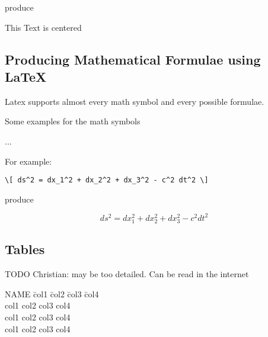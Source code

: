 produce 

\begin{center}
This Text is centered
\end{center}


\subsection{Producing Mathematical Formulae using \LaTeX}

Latex supports almost every math symbol and every possible formulae.

Some examples for the math symbols

... 


For example:

\begin{verbatim}
\[ ds^2 = dx_1^2 + dx_2^2 + dx_3^2 - c^2 dt^2 \]
\end{verbatim}

produce 

\[ ds^2 = dx_1^2 + dx_2^2 + dx_3^2 - c^2 dt^2 \]





\subsection{Tables}

TODO Christian: may be too detailed. Can be read in the internet

\begin{tabbing}
\textsc{NAME} \=col1 \=col2 \=col3 \=col4 \\
\>col1 \>col2 \>col3 \>col4 \\
\>col1 \>col2 \>col3 \>col4 \\
\>col1 \>col2 \>col3 \>col4 \\
\end{tabbing}


